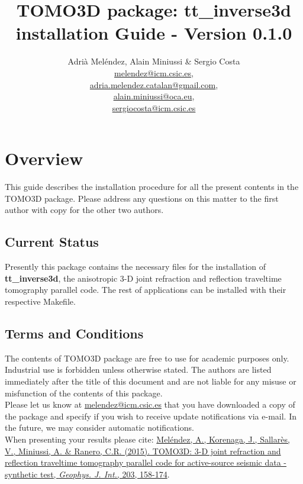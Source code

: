 \documentclass[twoside,final,onecolumn]{article}
\begin{document}
\title{
TOMO3D package: tt\_inverse3d installation Guide - Version 0.1.0\\
} 

\author{Adri\`{a} Mel\'{e}ndez, Alain Miniussi \& Sergio Costa\\
  \href{mailto:melendez@icm.csic.es}{melendez@icm.csic.es},\\
  \href{mailto:adria.melendez.catalan@gmail.com}{adria.melendez.catalan@gmail.com},\\
  \href{mailto:alain.miniussi@oca.eu}{alain.miniussi@oca.eu}, \\
  \href{mailto:sergiocosta@icm.csic.es}{sergiocosta@icm.csic.es} \\
}
\maketitle

\tableofcontents

\section{Overview}

This guide describes the installation procedure for all the present contents in the TOMO3D package.
Please address any questions on this matter to the first author with copy for the other two authors.

\subsection{Current Status}

Presently this package contains the necessary files for the installation of \textbf{tt\_inverse3d},
the anisotropic 3-D joint refraction and reflection traveltime tomography parallel code. The rest of applications 
can be installed with their respective Makefile.\\

\subsection{Terms and Conditions}
The contents of TOMO3D package are free to use for academic purposes only. Industrial use is forbidden unless otherwise stated.
The authors are listed immediately after the title of this document and are not liable for any misuse or misfunction of the contents of this package.\\
Please let us know at \href{mailto:melendez@icm.csic.es}{melendez@icm.csic.es} that you have downloaded a copy of the package and specify if you wish
to receive update notifications via e-mail. In the future, we may consider automatic notifications.\\
When presenting your results please cite: \href{http://www.dx.doi.org/10.1093/gji/ggv292}{Mel\'{e}ndez, A., Korenaga, J., Sallar\`{e}s, V., Miniussi, A. \& Ranero, C.R. (2015).
TOMO3D: 3-D joint refraction and reflection traveltime tomography parallel code for active-source seismic data - synthetic test, \textit{Geophys. J. Int.}, 203, 158-174}.
\end{document}
